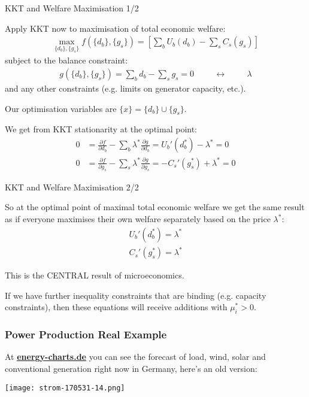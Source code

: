\documentclass[10pt,aspectratio=169,dvipsnames]{beamer}
\def\l{\lambda}
\def\m{\mu}
\def\d{\partial}
\begin{document}
\begin{frame}{KKT and Welfare Maximisation 1/2}

  Apply KKT now to maximisation of total economic welfare:
  \begin{align*}
    \max_{\{d_b\}, \{g_s\}} f(\{d_b\}, \{g_s\}) = \left[ \sum_b U_b (d_b)  -  \sum_s C_s (g_s) \right]
  \end{align*}
  subject to the balance constraint:
  \begin{align*}
    g(\{d_b\}, \{g_s\}) = \sum_b d_b -  \sum_s g_s  = 0 \hspace{1cm} \leftrightarrow \hspace{1cm} \l
  \end{align*}
  and any other constraints (e.g. limits on generator capacity, etc.).

  Our optimisation variables are $\{x\} = \{d_b\} \cup \{g_s\}$.

  We get from KKT stationarity at the optimal point:
  \begin{align*}
    0 & =   \frac{\d f}{\d d_b} - \sum_b \l^* \frac{\d g}{\d d_b} = U_b'(d_b^*) - \l^* = 0 \\
    0 & =   \frac{\d f}{\d g_s} - \sum_s \l^* \frac{\d g}{\d g_s} = -C_s'(g_s^*) + \l^* = 0
  \end{align*}


\end{frame}





\begin{frame}{KKT and Welfare Maximisation 2/2}

  So at the optimal point of maximal total economic welfare we get the
  same result as if everyone maximises their own welfare separately based on the price $\l^*$:
  \begin{align*}
 U_b'(d_b^*) =  \l^*  \\
 C_s'(g_s^*) = \l^*
  \end{align*}

  This is the CENTRAL result of microeconomics.

  If we have further inequality constraints that are binding (e.g. capacity constraints), then
  these equations will receive additions with $\m_i^* > 0$.


\end{frame}



\begin{frame}[fragile]
  \frametitle{Power Production Real Example}

  At \href{https://energy-charts.de/power_de.htm}{\bf\color{blue}\underline{energy-charts.de}}  you can see the forecast of load, wind, solar and conventional generation right now in Germany, here's an old version:


  \centering
    \texttt{[image: strom-170531-14.png]}


\end{frame}
\end{document}
